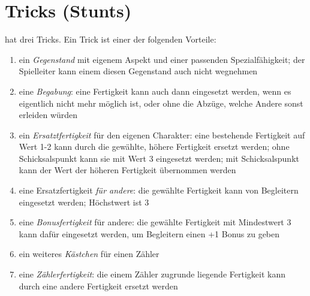 \documentclass{tufte-handout}
\begin{document}
\section{Tricks (Stunts)}

 hat drei Tricks. Ein Trick ist einer der folgenden
Vorteile:

\begin{enumerate}

\item ein \textit{Gegenstand} mit eigenem Aspekt und einer passenden
  Spezialfähigkeit; der Spielleiter kann einem diesen Gegenstand auch
  nicht wegnehmen

\item eine \textit{Begabung}: eine Fertigkeit kann auch dann
  eingesetzt werden, wenn es eigentlich nicht mehr möglich ist, oder
  ohne die Abzüge, welche Andere sonst erleiden würden

\item ein \textit{Ersatztfertigkeit} für den eigenen Charakter: eine
  bestehende Fertigkeit auf Wert 1-2 kann durch die gewählte, höhere
  Fertigkeit ersetzt werden; ohne Schicksalspunkt kann sie mit Wert 3
  eingesetzt werden; mit Schicksalspunkt kann der Wert der höheren
  Fertigkeit übernommen werden

\item eine Ersatzfertigkeit \textit{für andere}: die gewählte
  Fertigkeit kann von Begleitern eingesetzt werden; Höchstwert ist 3

\item eine \textit{Bonusfertigkeit} für andere: die gewählte Fertigkeit
  mit Mindestwert 3 kann dafür eingesetzt werden, um Begleitern einen
  +1 Bonus zu geben

\item ein weiteres \textit{Kästchen} für einen Zähler

\item eine \textit{Zählerfertigkeit}: die einem Zähler zugrunde
  liegende Fertigkeit kann durch eine andere Fertigkeit ersetzt
  werden

\end{enumerate}
\end{document}
